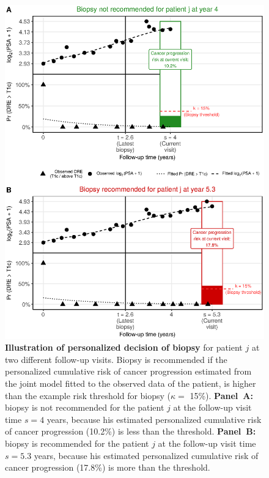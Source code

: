 \begin{figure}[!htb]
\captionsetup{justification=justified}
\centerline{\includegraphics[width=\columnwidth]{images/dynRiskPlot_2340.eps}}
\caption{\textbf{Illustration of personalized decision of biopsy} for patient $j$ at two different follow-up visits. Biopsy is recommended if the personalized cumulative risk of cancer progression estimated from the joint model fitted to the observed data of the patient, is higher than the example risk threshold for biopsy ($\kappa=$ 15\%). \textbf{Panel~A:} biopsy is not recommended for the patient $j$ at the follow-up visit time $s=4$ years, because his estimated personalized cumulative risk of cancer progression (10.2\%) is less than the threshold. \textbf{Panel~B:} biopsy is recommended for the patient $j$ at the follow-up visit time $s=5.3$ years, because his estimated personalized cumulative risk of cancer progression (17.8\%) is more than the threshold.}
\label{fig:dynRiskPlot_2340}
\end{figure}

